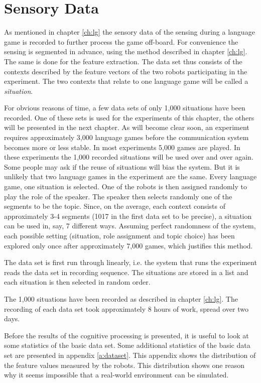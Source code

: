 \section{Sensory Data}\label{s:st:data}

As mentioned in chapter \ref{ch:lg} the sensory data of the
sensing during a language game is recorded to further
process the game off-board. For convenience the sensing is segmented in advance, using the method
described in chapter \ref{ch:lg}. The same is done for the feature extraction. The data set thus consists of
the contexts described by the feature vectors of the two robots participating in the experiment. The two contexts that relate to one language game will be called a {\em situation}.


For obvious reasons of time, a few data sets of only 1,000
situations have been recorded. One of these sets is used for the experiments of this chapter, the others will be presented in the next chapter. As will become clear soon,
an experiment requires approximately 3,000 language
games before the communication system becomes more or less stable. In most experiments 5,000 games are played. In these experiments the
1,000 recorded situations will be used over and over again. Some people may ask if the reuse of situations will bias the system. But it is unlikely that two language games in the experiment are the same.
Every language game, one situation is selected. One of the
robots is then assigned randomly to play the role of the
speaker. The speaker then selects randomly one of the segments
to be the topic. Since, on the average, each context consists
of approximately 3-4 segments (1017 in the first data set to be
precise), a situation can be used in, say, 7 different ways. Assuming
perfect randomness of the system, each possible setting
(situation, role assignment and topic choice) has been explored only once
after approximately 7,000 games, which justifies this method. 

The data set is first run through linearly, i.e. the system that runs
the experiment reads the data set in recording sequence. 
The situations are stored in a list and each situation is then selected in
random order.


The 1,000 situations have been recorded as described in chapter
\ref{ch:lg}. The recording of each data set took approximately 8 hours of work,
spread over two days.



Before the results of the cognitive processing is presented, it is useful to look at some statistics of the basic data set. Some additional statistics of the basic data set are presented in appendix \ref{a:dataset}. This appendix shows the distribution of the feature values measured by the robots. This distribution shows one reason why it seems impossible that a real-world environment can be simulated.

